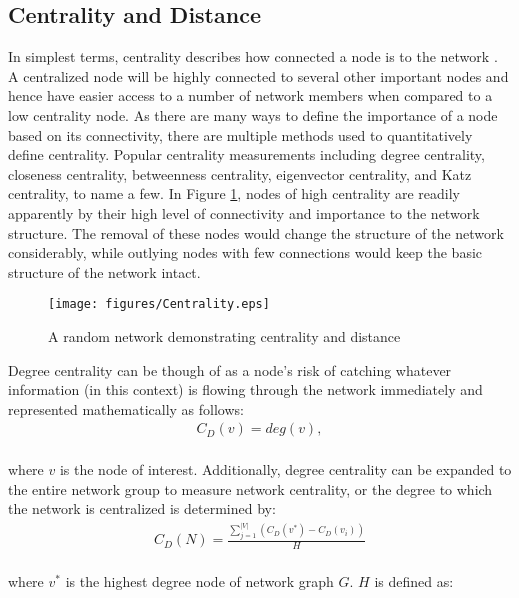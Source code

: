 {\subsection{Centrality and Distance}
In simplest terms, centrality describes how connected a node is to the network \cite{sigala2012social}. A centralized node will be highly connected to several other important nodes and hence have easier access to a number of network members when compared to a low centrality node. As there are many ways to define the importance of a node based on its connectivity, there are multiple methods used to quantitatively define centrality. Popular centrality measurements including degree centrality, closeness centrality, betweenness centrality, eigenvector centrality, and Katz centrality, to name a few. In Figure \ref{fig:Centrality}, nodes of high centrality are readily apparently by their high level of connectivity and importance to the network structure. The removal of these nodes would change the structure of the network considerably, while outlying nodes with few connections would keep the basic structure of the network intact. 
\begin{figure}[!htbp] \centering
  \texttt{[image: figures/Centrality.eps]}
  \caption{A random network demonstrating centrality and distance}
  \label{fig:Centrality}
\end{figure}
Degree centrality can be though of as a node's risk of catching whatever information (in this context) is flowing through the network immediately and represented mathematically as follows:
\begin{equation}\label{eqn:Degree_Centrality}
\left.\begin{aligned}
C_D(v)=deg(v),
\end{aligned}\right.
\end{equation}\\
\noindent where $v$ is the node of interest. Additionally, degree centrality can be expanded to the entire network group to measure network centrality, or the degree to which the network is centralized is determined by: 
\begin{equation}\label{eqn:Network_Centrality}
\left.\begin{aligned}
C_D(N) = \frac{\sum_{j=1}^{|V|}(C_D(v^*)-C_D(v_i))}{H}
\end{aligned}\right.
\end{equation}\\
\noindent where $v^*$ is the highest degree node of network graph $G$. $H$ is defined as:
}
